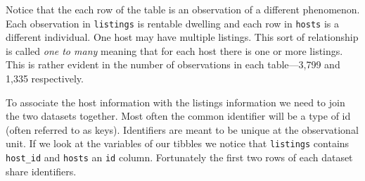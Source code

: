 \documentclass[
]{book}
\newenvironment{Shaded}{\begin{snugshade}}{\end{snugshade}}
\newcommand{\CommentTok}[1]{\textcolor[rgb]{0.56,0.35,0.01}{\textit{#1}}}
\newcommand{\KeywordTok}[1]{\textcolor[rgb]{0.13,0.29,0.53}{\textbf{#1}}}
\newcommand{\NormalTok}[1]{#1}
\newcommand{\StringTok}[1]{\textcolor[rgb]{0.31,0.60,0.02}{#1}}
\begin{document}
\begin{Shaded}
\end{Shaded}

Notice that the each row of the table is an observation of a different phenomenon. Each observation in \texttt{listings} is rentable dwelling and each row in \texttt{hosts} is a different individual. One host may have multiple listings. This sort of relationship is called \emph{one to many} meaning that for each host there is one or more listings. This is rather evident in the number of observations in each table---3,799 and 1,335 respectively.

To associate the host information with the listings information we need to join the two datasets together. Most often the common identifier will be a type of id (often referred to as keys). Identifiers are meant to be unique at the observational unit. If we look at the variables of our tibbles we notice that \texttt{listings} contains \texttt{host\_id} and \texttt{hosts} an \texttt{id} column. Fortunately the first two rows of each dataset share identifiers.
\end{document}
